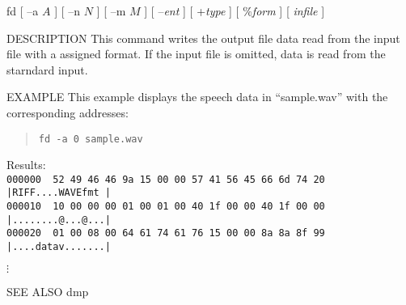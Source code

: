 
\begin{synopsis}
 \item [fd] [ --a $A$ ] [ --n $N$ ] [ --m $M$ ] [ --{\em ent} ] 
	    [ +{\em type} ] [ $\%${\em form} ] [ {\em infile} ]
\end{synopsis}

\begin{qsection}{DESCRIPTION}
This command writes the output file data read from the input file
with a assigned format.
If the input file is omitted, data is read from the starndard input.
\end{qsection}

\begin{options}
\end{options}

\begin{qsection}{EXAMPLE}
 This example displays the speech data in ``sample.wav'' with
 the corresponding addresses:
\begin{quote}
 \verb!fd -a 0 sample.wav!
\end{quote}
 Results:\\
\verb!000000  52 49 46 46 9a 15 00 00 57 41 56 45 66 6d 74 20 |RIFF....WAVEfmt |!\\
\verb!000010  10 00 00 00 01 00 01 00 40 1f 00 00 40 1f 00 00 |........@...@...|!\\
\verb!000020  01 00 08 00 64 61 74 61 76 15 00 00 8a 8a 8f 99 |....datav.......|!

\begin{center}
 $\vdots$\\
\end{center}
\end{qsection}

\begin{qsection}{SEE ALSO}
 dmp
\end{qsection}
